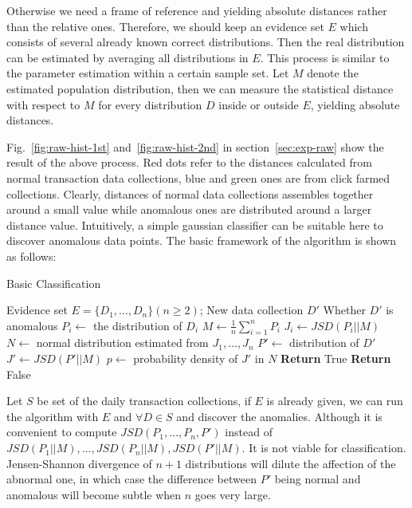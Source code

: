 \documentclass[a4paper]{IEEEtran}
\begin{document}
			Otherwise we need a frame of reference and yielding absolute distances rather than the relative ones. Therefore, we should keep an evidence set $E$ which consists of several already known correct distributions. Then the real distribution can be estimated by averaging all distributions in $E$. This process is similar to the parameter estimation within a certain sample set. Let $M$ denote the estimated population distribution, then we can measure the statistical distance with respect to $M$ for every distribution $D$ inside or outside $E$, yielding absolute distances. 
			
			Fig.~\ref{fig:raw-hist-1st} and~\ref{fig:raw-hist-2nd} in section~\ref{sec:exp-raw} show the result of the above process. Red dots refer to the distances calculated from normal transaction data collections, blue and green ones are from click farmed collections. Clearly, distances of normal data collections assembles together around a small value while anomalous ones are distributed around a larger distance value. Intuitively, a simple gaussian classifier can be suitable here to discover anomalous data points. The basic framework of the algorithm is shown as follows:
			
			\begin{algorithm}[!ht]
				\caption{Basic Classification}
				\label{alg:static}
				\begin{algorithmic}[1]
					\Require Evidence set $E = \{D_1, \dots, D_n\}(n\ge2)$; New data collection $D'$
					\Ensure Whether $D'$ is anomalous
					\State $P_i \gets$ the distribution of $D_i$
					\EndFor
					\State $M \gets \frac{1}{n}\sum_{i=1}^{n}P_i$\label{line:population-estimation}
					\State $J_i \gets JSD(P_i||M)$
					\EndFor
					\State $N \gets$ normal distribution estimated from $J_1, \dots, J_n$
					\State $P' \gets$ distribution of $D'$
					\State $J' \gets JSD(P'||M)$
					\State $p \gets$ probability density of $J'$ in $N$
					\State \textbf{Return} True
					\Else
					\State \textbf{Return} False
					\EndIf
				\end{algorithmic}
			\end{algorithm}
			
			Let $S$ be set of the daily transaction collections, if $E$ is already given, we can run the algorithm with $E$ and $\forall D \in S$ and discover the anomalies. Although it is convenient to compute $JSD(P_1, \dots, P_n, P')$ instead of $JSD(P_1||M), \dots, JSD(P_n||M), JSD(P'||M)$. It is not viable for classification. Jensen-Shannon divergence of $n+1$ distributions will dilute the affection of the abnormal one, in which case the difference between $P'$ being normal and anomalous will become subtle when $n$ goes very large.
			
\end{document}
